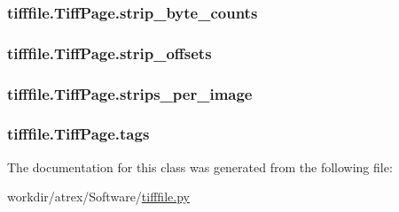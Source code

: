\hypertarget{classtifffile_1_1_tiff_page_ac55af94dba8786edaf1e89d205aed908}{
\subsubsection[{strip\-\_\-byte\-\_\-counts}]{\setlength{\rightskip}{0pt plus 5cm}tifffile.\-Tiff\-Page.\-strip\-\_\-byte\-\_\-counts}}\label{classtifffile_1_1_tiff_page_ac55af94dba8786edaf1e89d205aed908}
\hypertarget{classtifffile_1_1_tiff_page_aa3c254120ad8e9394ecb5c743ebf7434}{
\subsubsection[{strip\-\_\-offsets}]{\setlength{\rightskip}{0pt plus 5cm}tifffile.\-Tiff\-Page.\-strip\-\_\-offsets}}\label{classtifffile_1_1_tiff_page_aa3c254120ad8e9394ecb5c743ebf7434}
\hypertarget{classtifffile_1_1_tiff_page_a2c728cfc9795dc4bf187308d551cecb1}{
\subsubsection[{strips\-\_\-per\-\_\-image}]{\setlength{\rightskip}{0pt plus 5cm}tifffile.\-Tiff\-Page.\-strips\-\_\-per\-\_\-image}}\label{classtifffile_1_1_tiff_page_a2c728cfc9795dc4bf187308d551cecb1}
\hypertarget{classtifffile_1_1_tiff_page_aa35f477474445140346421065a4c016b}{
\subsubsection[{tags}]{\setlength{\rightskip}{0pt plus 5cm}tifffile.\-Tiff\-Page.\-tags}}\label{classtifffile_1_1_tiff_page_aa35f477474445140346421065a4c016b}


The documentation for this class was generated from the following file\-:\begin{DoxyCompactItemize}
\item 
workdir/atrex/\-Software/\hyperlink{tifffile_8py}{tifffile.\-py}\end{DoxyCompactItemize}

